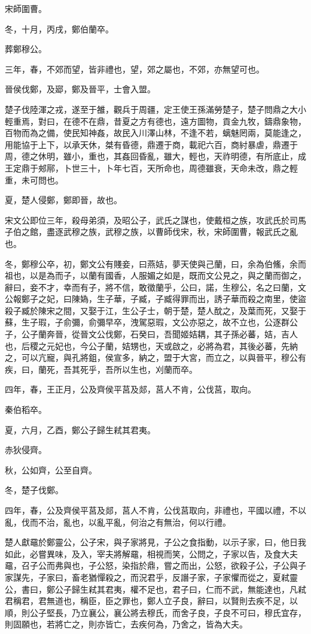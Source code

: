 \begin{pinyinscope}
宋師圍曹。

冬，十月，丙戌，鄭伯蘭卒。

葬鄭穆公。

三年，春，不郊而望，皆非禮也，望，郊之屬也，不郊，亦無望可也。

晉侯伐鄭，及郔，鄭及晉平，士會入盟。

楚子伐陸渾之戎，遂至于雒，觀兵于周疆，定王使王孫滿勞楚子，楚子問鼎之大小輕重焉，對曰，在德不在鼎，昔夏之方有德也，遠方圖物，貢金九牧，鑄鼎象物，百物而為之備，使民知神姦，故民入川澤山林，不逢不若，螭魅罔兩，莫能逢之，用能協于上下，以承天休，桀有昏德，鼎遷于商，載祀六百，商紂暴虐，鼎遷于周，德之休明，雖小，重也，其姦回昏亂，雖大，輕也，天祚明德，有所底止，成王定鼎于郟鄏，卜世三十，卜年七百，天所命也，周德雖衰，天命未改，鼎之輕重，未可問也。

夏，楚人侵鄭，鄭即晉，故也。

宋文公即位三年，殺母弟須，及昭公子，武氏之謀也，使戴桓之族，攻武氏於司馬子伯之館，盡逐武穆之族，武穆之族，以曹師伐宋，秋，宋師圍曹，報武氏之亂也。

冬，鄭穆公卒，初，鄭文公有賤妾，曰燕姞，夢天使與己蘭，曰，余為伯鯈，余而祖也，以是為而子，以蘭有國香，人服媚之如是，既而文公見之，與之蘭而御之，辭曰，妾不才，幸而有子，將不信，敢徵蘭乎，公曰，諾，生穆公，名之曰蘭，文公報鄭子之妃，曰陳媯，生子華，子臧，子臧得罪而出，誘子華而殺之南里，使盜殺子臧於陳宋之間，又娶于江，生公子士，朝于楚，楚人酖之，及葉而死，又娶于蘇，生子瑕，子俞彌，俞彌早卒，洩駕惡瑕，文公亦惡之，故不立也，公逐群公子，公子蘭奔晉，從晉文公伐鄭，石癸曰，吾聞姬姞耦，其子孫必蕃，姞，吉人也，后稷之元妃也，今公子蘭，姞甥也，天或啟之，必將為君，其後必蕃，先納之，可以亢寵，與孔將鉏，侯宣多，納之，盟于大宮，而立之，以與晉平，穆公有疾，曰，蘭死，吾其死乎，吾所以生也，刈蘭而卒。

四年，春，王正月，公及齊侯平莒及郯，莒人不肯，公伐莒，取向。

秦伯稻卒。

夏，六月，乙酉，鄭公子歸生弒其君夷。

赤狄侵齊。

秋，公如齊，公至自齊。

冬，楚子伐鄭。

四年，春，公及齊侯平莒及郯，莒人不肯，公伐莒取向，非禮也，平國以禮，不以亂，伐而不治，亂也，以亂平亂，何治之有無治，何以行禮。

楚人獻黿於鄭靈公，公子宋，與子家將見，子公之食指動，以示子家，曰，他日我如此，必嘗異味，及入，宰夫將解黿，相視而笑，公問之，子家以告，及食大夫黿，召子公而弗與也，子公怒，染指於鼎，嘗之而出，公怒，欲殺子公，子公與子家謀先，子家曰，畜老猶憚殺之，而況君乎，反譖子家，子家懼而從之，夏弒靈公，書曰，鄭公子歸生弒其君夷，權不足也，君子曰，仁而不武，無能達也，凡弒君稱君，君無道也，稱臣，臣之罪也，鄭人立子良，辭曰，以賢則去疾不足，以順，則公子堅長，乃立襄公，襄公將去穆氏，而舍子良，子良不可曰，穆氏宜存，則固願也，若將亡之，則亦皆亡，去疾何為，乃舍之，皆為大夫。


\end{pinyinscope}
